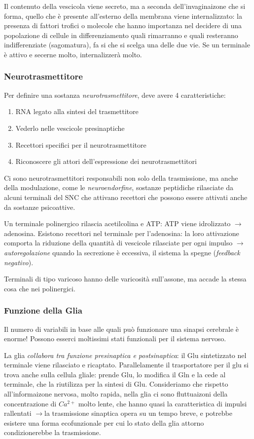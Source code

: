 \documentclass[a4paper,12pt]{article}
\newcommand{\lfreccia}{\ensuremath{\longrightarrow}}
\begin{document}
Il contenuto della vescicola viene secreto, ma a seconda dell'invaginaizone che si forma, quello che è presente all'esterno della membrana viene internalizzato: la presenza di fattori trofici o molecole che hanno importanza nel decidere di una popolazione di cellule in differenziamento quali rimarranno e quali resteranno indifferenziate (sagomatura), fa si che si scelga una delle due vie. Se un terminale è attivo e secerne molto, internalizzerà molto. 

\subsubsection{Neurotrasmettitore}
Per definire una sostanza \emph{neurotrasmettitore}, deve avere 4 caratteristiche:
\begin{enumerate}
\item{RNA legato alla sintesi del trasmettitore}
\item{Vederlo nelle vescicole presinaptiche}
\item{Recettori specifici per il neurotrasmettitore}
\item{Riconoscere gli attori dell'espressione dei neurotrasmettitori}
\end{enumerate}

Ci sono neurotrasmettitori responsabili non solo della trasmissione, ma anche della modulazione, come le \emph{neuroendorfine}, sostanze peptidiche rilasciate da alcuni terminali del SNC che attivano recettori che possono essere attivati anche da sostanze psicoattive.

Un terminale polinergico rilascia acetilcolina e ATP: ATP viene idrolizzato \lfreccia adenosina. Esistono recettori nel terminale per l'adenosina: la loro attivazione comporta la riduzione della quantità di vescicole rilasciate per ogni impulso \lfreccia \emph{autoregolazione} quando la secrezione è eccessiva, il sistema la spegne (\emph{feedback negativo}).

Terminali di tipo varicoso hanno delle varicosità sull'assone, ma accade la stessa cosa che nei polinergici.

\subsubsection{Funzione della Glia}
Il numero di variabili in base alle quali può funzionare una sinapsi cerebrale è enorme! Possono esserci moltissimi stati funzionali per il sistema nervoso.

La glia \emph{collabora tra funzione presinaptica e postsinaptica}: il Glu sintetizzato nel terminale viene rilasciato e ricaptato. Parallelamente il trasportatore per il glu si trova anche sulla cellula gliale: prende Glu, lo modifica il Gln e la cede al terminale, che la riutilizza per la sintesi di Glu. Consideriamo che rispetto all'informaizone nervosa, molto rapida, nella glia ci sono fluttuaizoni della concentrazione di $Ca^{2+}$ molto lente, che hanno quasi la caratteristica di impulsi rallentati \lfreccia la trasmissione sinaptica opera su un tempo breve, e potrebbe esistere una forma ecofunzionale per cui lo stato della glia attorno condizionerebbe la trasmissione.
\end{document}
